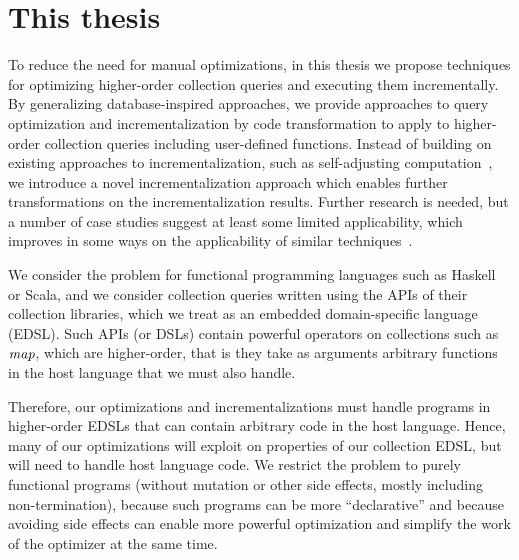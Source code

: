 \section{This thesis}
To reduce the need for manual optimizations, in this thesis we propose
techniques for optimizing higher-order collection queries and executing them
incrementally.
By generalizing database-inspired approaches, we provide approaches to query optimization and
incrementalization by code transformation to apply to higher-order collection
queries including user-defined functions.
Instead of building on existing approaches to incrementalization, such as
self-adjusting computation~\citep{Acar09}, we introduce a novel
incrementalization approach which enables further transformations on the
incrementalization results.
%
Further research is needed, but a number of case studies suggest at least some
limited applicability, which improves in some ways on the applicability of similar
techniques~\citep{Koch2016incremental}.

We consider the problem for functional programming languages such as Haskell or
Scala, and we consider collection queries written using the APIs of their
collection libraries, which we treat as an embedded domain-specific language (EDSL). Such
APIs (or DSLs) contain powerful operators on collections such as $\mathit{map}$,
which are higher-order, that
is they take as arguments arbitrary functions in the host language that we must
also handle.

Therefore, our optimizations and incrementalizations must handle programs in
higher-order EDSLs that can contain arbitrary code in the host language. Hence,
many of our optimizations will exploit on properties of our collection EDSL, but
will need to handle host language code. We restrict the problem to purely
functional programs (without mutation or other side effects, mostly including
non-termination), because such programs can be more ``declarative'' and because
avoiding side effects can enable more powerful optimization and simplify the
work of the optimizer at the same time.

